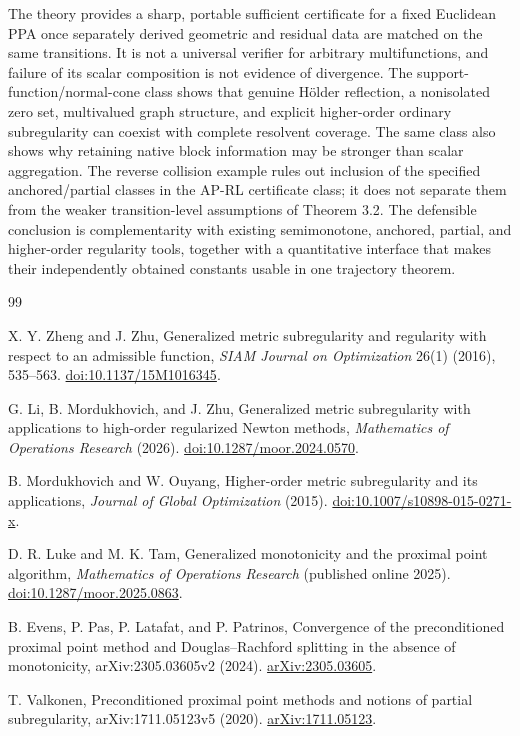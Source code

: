 \documentclass[11pt,a4paper]{article}
\theoremstyle{plain}
\theoremstyle{definition}
\theoremstyle{remark}
\begin{document}
The theory provides a sharp, portable sufficient certificate for a fixed
Euclidean PPA once separately derived geometric and residual data are
matched on the same transitions. It is not a universal verifier for
arbitrary multifunctions, and failure of its scalar composition is not
evidence of divergence. The support-function/normal-cone class shows
that genuine Hölder reflection, a nonisolated zero set, multivalued
graph structure, and explicit higher-order ordinary subregularity can
coexist with complete resolvent coverage. The same class also shows why
retaining native block information may be stronger than scalar
aggregation. The reverse collision example rules out inclusion of the
specified anchored/partial classes in the AP-RL certificate class; it
does not separate them from the weaker transition-level assumptions of
Theorem 3.2. The defensible conclusion is complementarity with existing
semimonotone, anchored, partial, and higher-order regularity tools,
together with a quantitative interface that makes their independently
obtained constants usable in one trajectory theorem.

\renewcommand{\refname}{Selected references}
\small
\begin{thebibliography}{99}

X. Y. Zheng and J. Zhu,
\newblock Generalized metric subregularity and regularity with respect to an admissible function,
\newblock \emph{SIAM Journal on Optimization} 26(1) (2016), 535--563.
\newblock \href{https://doi.org/10.1137/15M1016345}{doi:10.1137/15M1016345}.

G. Li, B. Mordukhovich, and J. Zhu,
\newblock Generalized metric subregularity with applications to high-order regularized Newton methods,
\newblock \emph{Mathematics of Operations Research} (2026).
\newblock \href{https://doi.org/10.1287/moor.2024.0570}{doi:10.1287/moor.2024.0570}.

B. Mordukhovich and W. Ouyang,
\newblock Higher-order metric subregularity and its applications,
\newblock \emph{Journal of Global Optimization} (2015).
\newblock \href{https://doi.org/10.1007/s10898-015-0271-x}{doi:10.1007/s10898-015-0271-x}.

D. R. Luke and M. K. Tam,
\newblock Generalized monotonicity and the proximal point algorithm,
\newblock \emph{Mathematics of Operations Research} (published online 2025).
\newblock \href{https://doi.org/10.1287/moor.2025.0863}{doi:10.1287/moor.2025.0863}.

B. Evens, P. Pas, P. Latafat, and P. Patrinos,
\newblock Convergence of the preconditioned proximal point method and Douglas--Rachford splitting in the absence of monotonicity,
\newblock arXiv:2305.03605v2 (2024).
\newblock \href{https://arxiv.org/abs/2305.03605}{arXiv:2305.03605}.

T. Valkonen,
\newblock Preconditioned proximal point methods and notions of partial subregularity,
\newblock arXiv:1711.05123v5 (2020).
\newblock \href{https://arxiv.org/abs/1711.05123}{arXiv:1711.05123}.

\end{thebibliography}
\normalsize
\end{document}
